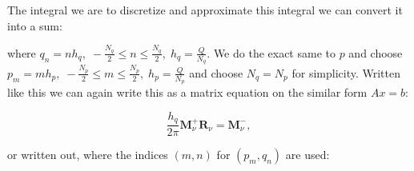 \documentclass[../main.tex]{subfiles}
\begin{document}
The integral  we are to discretize and approximate this integral we can convert it into a sum:



where $q_n = nh_q, \; -\frac{N_q}{2} \leq n \leq \frac{N_q}{2}, \; h_q = \frac{Q}{N_q}$. We do the exact same to $p$ and choose $p_m = mh_p, \; -\frac{N_p}{2} \leq m \leq \frac{N_p}{2}, \; h_p = \frac{Q}{N_p}$ and choose $N_q = N_p$ for simplicity. Written like this we can again write this as a matrix equation on the similar form $Ax=b$:

\begin{equation}
    \frac{h_q}{2\pi}\boldsymbol{M}_\nu^+\boldsymbol{R}_{\nu} = \boldsymbol{M}_\nu^-,
\end{equation}

or written out, where the indices $\left(m, n \right)$ for $\left(p_m, q_n \right)$ are used:

\end{document}
